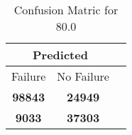 \begin{table}[] 
\caption{Confusion Matric for 80.0} 
\label{Table: Prediction Accuracy-DMD80.0OnlySunEKF-combinationReflection-Reflection} 
\centering 
\begin{tabular} 
 {@{}ccc@{}} 
\toprule 
\multicolumn{2}{c}{\textbf{Predicted}}
 \\ \midrule 
\multicolumn{1}{|c|}{Failure} & 
\multicolumn{1}{c|}{No Failure}
 \\ \midrule 
\multicolumn{1}{|c|}{\color{green}\textbf{98843}} & 
\multicolumn{1}{c|}{\color{red}\textbf{24949}}
 \\ \midrule 
\multicolumn{1}{|c|}{\color{red}\textbf{9033}} & 
\multicolumn{1}{c|}{\color{green}\textbf{37303}}
 \\ \bottomrule 
\end{tabular} 
\end{table} 
